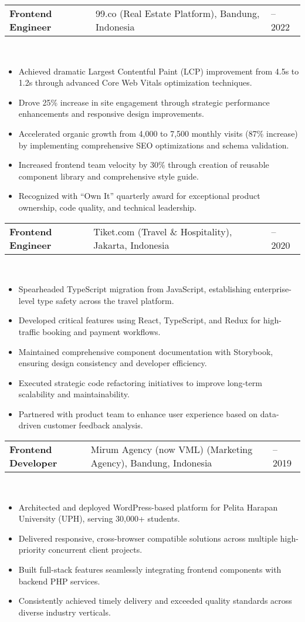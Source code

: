\documentclass[a4paper, 11pt]{article}
\newcommand{\resumeItem}[1]{
  \item\small{
    {#1 \vspace{-2pt}}
  }
}
\newcommand{\resumeSubheading}[4]{
  \vspace{-2pt}\item
    \begin{tabularx}{0.987\textwidth}[t]{
  >{\raggedright\arraybackslash}X
  >{\centering\arraybackslash}X
  >{\raggedleft\arraybackslash}X }
      \textbf{#1} & #2 & #3 \\
    \end{tabularx}
    \textit{\small#4}\\
    \vspace{-7pt}
}
\newcommand{\resumeItemListStart}{\begin{itemize}[leftmargin=0.22in]}
\newcommand{\resumeItemListEnd}{\end{itemize}\vspace{-20pt}}
\begin{document}
        \resumeSubheading
            {Frontend Engineer}{99.co (Real Estate Platform), Bandung, Indonesia}{2020 -- 2022}{}
            \resumeItemListStart
                \resumeItem{Achieved dramatic Largest Contentful Paint (LCP) improvement from 4.5s to 1.2s through advanced Core Web Vitals optimization techniques.}
                \resumeItem{Drove 25\% increase in site engagement through strategic performance enhancements and responsive design improvements.}
                \resumeItem{Accelerated organic growth from 4,000 to 7,500 monthly visits (87\% increase) by implementing comprehensive SEO optimizations and schema validation.}
                \resumeItem{Increased frontend team velocity by 30\% through creation of reusable component library and comprehensive style guide.}
                \resumeItem{Recognized with ``Own It'' quarterly award for exceptional product ownership, code quality, and technical leadership.}
            \resumeItemListEnd

        \resumeSubheading
            {Frontend Engineer}{Tiket.com (Travel \& Hospitality), Jakarta, Indonesia}{2019 -- 2020}{}
            \resumeItemListStart
                \resumeItem{Spearheaded TypeScript migration from JavaScript, establishing enterprise-level type safety across the travel platform.}
                \resumeItem{Developed critical features using React, TypeScript, and Redux for high-traffic booking and payment workflows.}
                \resumeItem{Maintained comprehensive component documentation with Storybook, ensuring design consistency and developer efficiency.}
                \resumeItem{Executed strategic code refactoring initiatives to improve long-term scalability and maintainability.}
                \resumeItem{Partnered with product team to enhance user experience based on data-driven customer feedback analysis.}
            \resumeItemListEnd

        \resumeSubheading
            {Frontend Developer}{Mirum Agency (now VML) (Marketing Agency), Bandung, Indonesia}{2018 -- 2019}{}
            \resumeItemListStart
                \resumeItem{Architected and deployed WordPress-based platform for Pelita Harapan University (UPH), serving 30,000+ students.}
                \resumeItem{Delivered responsive, cross-browser compatible solutions across multiple high-priority concurrent client projects.}
                \resumeItem{Built full-stack features seamlessly integrating frontend components with backend PHP services.}
                \resumeItem{Consistently achieved timely delivery and exceeded quality standards across diverse industry verticals.}
            \resumeItemListEnd
\end{document}
